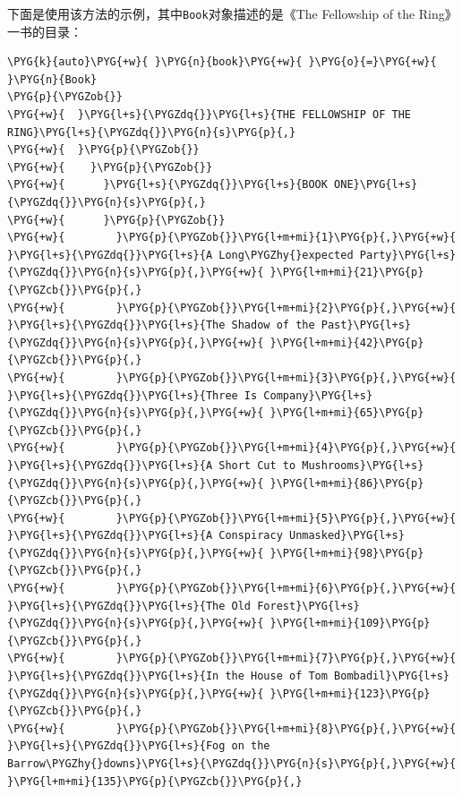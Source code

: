 
下面是使用该方法的示例，其中\texttt{Book}对象描述的是《The Fellowship of the Ring》一书的目录：



\begin{codeblockbg}
\begin{Verbatim}[commandchars=\\\{\},breaklines=true,breakanywhere=true,fontsize=\codefont,xleftmargin=17bp]
\PYG{k}{auto}\PYG{+w}{ }\PYG{n}{book}\PYG{+w}{ }\PYG{o}{=}\PYG{+w}{ }\PYG{n}{Book}
\PYG{p}{\PYGZob{}}
\PYG{+w}{  }\PYG{l+s}{\PYGZdq{}}\PYG{l+s}{THE FELLOWSHIP OF THE RING}\PYG{l+s}{\PYGZdq{}}\PYG{n}{s}\PYG{p}{,}
\PYG{+w}{  }\PYG{p}{\PYGZob{}}
\PYG{+w}{    }\PYG{p}{\PYGZob{}}
\PYG{+w}{      }\PYG{l+s}{\PYGZdq{}}\PYG{l+s}{BOOK ONE}\PYG{l+s}{\PYGZdq{}}\PYG{n}{s}\PYG{p}{,}
\PYG{+w}{      }\PYG{p}{\PYGZob{}}
\PYG{+w}{        }\PYG{p}{\PYGZob{}}\PYG{l+m+mi}{1}\PYG{p}{,}\PYG{+w}{ }\PYG{l+s}{\PYGZdq{}}\PYG{l+s}{A Long\PYGZhy{}expected Party}\PYG{l+s}{\PYGZdq{}}\PYG{n}{s}\PYG{p}{,}\PYG{+w}{ }\PYG{l+m+mi}{21}\PYG{p}{\PYGZcb{}}\PYG{p}{,}
\PYG{+w}{        }\PYG{p}{\PYGZob{}}\PYG{l+m+mi}{2}\PYG{p}{,}\PYG{+w}{ }\PYG{l+s}{\PYGZdq{}}\PYG{l+s}{The Shadow of the Past}\PYG{l+s}{\PYGZdq{}}\PYG{n}{s}\PYG{p}{,}\PYG{+w}{ }\PYG{l+m+mi}{42}\PYG{p}{\PYGZcb{}}\PYG{p}{,}
\PYG{+w}{        }\PYG{p}{\PYGZob{}}\PYG{l+m+mi}{3}\PYG{p}{,}\PYG{+w}{ }\PYG{l+s}{\PYGZdq{}}\PYG{l+s}{Three Is Company}\PYG{l+s}{\PYGZdq{}}\PYG{n}{s}\PYG{p}{,}\PYG{+w}{ }\PYG{l+m+mi}{65}\PYG{p}{\PYGZcb{}}\PYG{p}{,}
\PYG{+w}{        }\PYG{p}{\PYGZob{}}\PYG{l+m+mi}{4}\PYG{p}{,}\PYG{+w}{ }\PYG{l+s}{\PYGZdq{}}\PYG{l+s}{A Short Cut to Mushrooms}\PYG{l+s}{\PYGZdq{}}\PYG{n}{s}\PYG{p}{,}\PYG{+w}{ }\PYG{l+m+mi}{86}\PYG{p}{\PYGZcb{}}\PYG{p}{,}
\PYG{+w}{        }\PYG{p}{\PYGZob{}}\PYG{l+m+mi}{5}\PYG{p}{,}\PYG{+w}{ }\PYG{l+s}{\PYGZdq{}}\PYG{l+s}{A Conspiracy Unmasked}\PYG{l+s}{\PYGZdq{}}\PYG{n}{s}\PYG{p}{,}\PYG{+w}{ }\PYG{l+m+mi}{98}\PYG{p}{\PYGZcb{}}\PYG{p}{,}
\PYG{+w}{        }\PYG{p}{\PYGZob{}}\PYG{l+m+mi}{6}\PYG{p}{,}\PYG{+w}{ }\PYG{l+s}{\PYGZdq{}}\PYG{l+s}{The Old Forest}\PYG{l+s}{\PYGZdq{}}\PYG{n}{s}\PYG{p}{,}\PYG{+w}{ }\PYG{l+m+mi}{109}\PYG{p}{\PYGZcb{}}\PYG{p}{,}
\PYG{+w}{        }\PYG{p}{\PYGZob{}}\PYG{l+m+mi}{7}\PYG{p}{,}\PYG{+w}{ }\PYG{l+s}{\PYGZdq{}}\PYG{l+s}{In the House of Tom Bombadil}\PYG{l+s}{\PYGZdq{}}\PYG{n}{s}\PYG{p}{,}\PYG{+w}{ }\PYG{l+m+mi}{123}\PYG{p}{\PYGZcb{}}\PYG{p}{,}
\PYG{+w}{        }\PYG{p}{\PYGZob{}}\PYG{l+m+mi}{8}\PYG{p}{,}\PYG{+w}{ }\PYG{l+s}{\PYGZdq{}}\PYG{l+s}{Fog on the Barrow\PYGZhy{}downs}\PYG{l+s}{\PYGZdq{}}\PYG{n}{s}\PYG{p}{,}\PYG{+w}{ }\PYG{l+m+mi}{135}\PYG{p}{\PYGZcb{}}\PYG{p}{,}

\end{Verbatim}
\end{codeblockbg}
